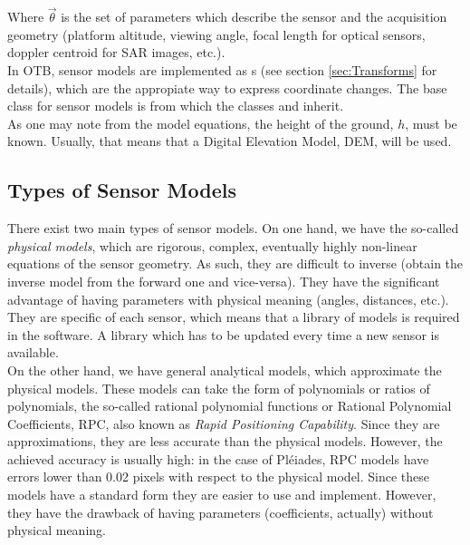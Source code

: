 Where $\vec\theta$ is the set of parameters which describe the sensor
and the acquisition geometry (platform altitude, viewing angle, focal
length for optical sensors, doppler centroid for SAR images, etc.).\\

In OTB, sensor models are implemented as s
(see section \ref{sec:Transforms} for details), which are the
appropiate way to express coordinate changes. The base class for
sensor models is  from which the classes
 and
 inherit.\\

As one may note from the model equations, the height of the ground, $h$,
must be known. Usually, that means that a Digital Elevation Model,
DEM, will be used.\\
  

\subsection{Types of Sensor Models}
\label{sec:TypesofSensorModels}
There exist two main types of sensor models. On one hand, we have the
so-called {\em physical models}, which are rigorous, complex,
eventually highly non-linear equations of the sensor geometry. As
such, they are difficult to inverse (obtain the inverse model from the
forward one and vice-versa). They have the significant advantage of having
parameters with physical meaning (angles, distances, etc.). They are
specific of each sensor, which means that a library of models is
required in the software. A library which has to be updated every time a new
sensor is available.\\

On the other hand, we have general analytical models, which
approximate the physical models. These models can take the form of
polynomials or ratios of polynomials, the so-called rational
polynomial functions or Rational Polynomial Coefficients, RPC, also
known as {\em Rapid Positioning Capability}.
Since they are approximations, they are less accurate than the
physical models. However, the achieved accuracy is usually high: in
the case of Pl\'eiades, RPC models have errors lower than 0.02 pixels
with respect to the physical model. Since these models have a standard
form they are easier to use and implement. However, they have the
drawback of having parameters (coefficients, actually) without
physical meaning.\\

